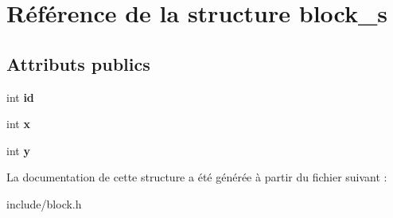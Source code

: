 \hypertarget{structblock__s}{}\section{Référence de la structure block\+\_\+s}
\label{structblock__s}
\subsection*{Attributs publics}
\begin{DoxyCompactItemize}
\item 
\mbox{\label{structblock__s_aa9dd98ce8df8bed4703396a0618131d8}} 
int {\bfseries id}
\item 
\mbox{\label{structblock__s_a78f591039c69f901f75461990bd0e343}} 
int {\bfseries x}
\item 
\mbox{\label{structblock__s_a03e2e847627473292542d6dcd3677ad2}} 
int {\bfseries y}
\end{DoxyCompactItemize}


La documentation de cette structure a été générée à partir du fichier suivant \+:\begin{DoxyCompactItemize}
\item 
include/block.\+h\end{DoxyCompactItemize}
